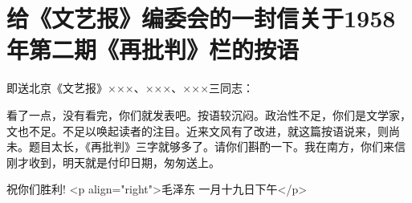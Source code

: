 \section[给《文艺报》编委会的一封信关于1958年第二期《再批判》栏的按语（一九五八年一月十九日）]{给《文艺报》编委会的一封信关于1958年第二期《再批判》栏的按语}


即送北京《文艺报》×××、×××、×××三同志：

看了一点，没有看完，你们就发表吧。按语较沉闷。政治性不足，你们是文学家，文也不足。不足以唤起读者的注目。近来文风有了改进，就这篇按语说来，则尚未。题目太长，《再批判》三字就够多了。请你们斟酌一下。我在南方，你们来信刚才收到，明天就是付印日期，匆匆送上。

祝你们胜利!
<p align="right">毛泽东
一月十九日下午</p>


